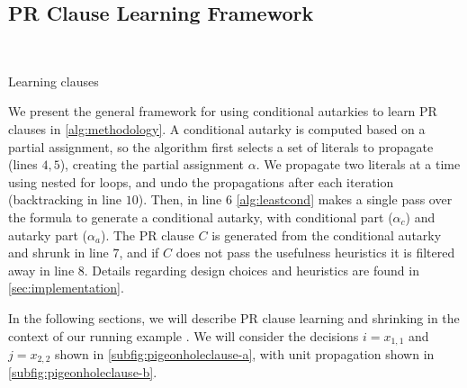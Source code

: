 \subsection{PR Clause Learning Framework}~\label{subsec:methodology}

\begin{algorithm}\caption{Learning \pr clauses}\label{alg:methodology}
    \SetAlgoNoLine
\end{algorithm}

We present the general framework for using conditional autarkies to learn PR clauses in \autoref{alg:methodology}. 
A conditional autarky is computed based on a partial assignment, 
so the algorithm first selects a set of literals to propagate (lines $4,5$), creating the partial assignment $\alpha$.
We propagate two literals at a time using nested for loops, and undo the propagations after each iteration (backtracking in line $10$).
Then, in line $6$ \autoref{alg:leastcond} makes a single pass over the formula to generate a conditional autarky, with conditional part ($\alpha_c$) and autarky part ($\alpha_a$).
The PR clause $C$ is generated from the conditional autarky and shrunk in line $7$, and if $C$ does not pass the usefulness heuristics it is filtered away in line $8$. 
Details regarding design choices and heuristics are found in \autoref{sec:implementation}.

In the following sections, we will describe PR clause learning and shrinking in the context of our running example  .
We will consider the decisions $i = x_{1, 1}$ and $j = x_{2, 2}$ shown in \autoref{subfig:pigeonholeclause-a}, with unit propagation shown in \autoref{subfig:pigeonholeclause-b}.

